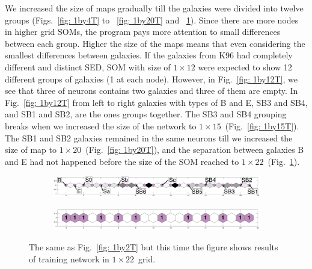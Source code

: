             We increased the size of maps gradually till the galaxies were divided into twelve groups (Figs.~\ref{fig: 1by4T} to ~\ref{fig: 1by20T} and ~\ref{fig: 1by22T}).
            Since there are more nodes in higher grid SOMs, the program pays more attention to small differences between each group.
            Higher the size of the maps means that even considering the smallest differences between galaxies.
            If the galaxies from K96 had completely different and distinct SED, SOM with size of $1\times12$ were expected to show 12 different groups of galaxies (1 at each node).
            However, in Fig.~\ref{fig: 1by12T}, we see that three of neurons contains two galaxies and  three of them are empty. 
            In Fig.~\ref{fig: 1by12T} from left to right galaxies with types of B and E, SB3 and SB4, and SB1 and SB2, are the ones groups together. 
            The SB3 and SB4 grouping breaks when we increased the size of the network to $1\times15$~(Fig.~\ref{fig: 1by15T}).
            The SB1 and SB2 galaxies remained in the same neurons till we increased the size of map to $1\times20$~(Fig.~\ref{fig: 1by20T}), and the separation between galaxies B and E had not happened before the size of the SOM reached to $1\times22$~(Fig.~\ref{fig: 1by22T}).
        \begin{figure}
            \begin{subfigure}[b]{\textwidth}
                \centering
                \includegraphics[width=\textwidth]{../images0.01/1d/dist_1_by_22.png}
            \end{subfigure}
            \hfill
            \begin{subfigure}[b]{\textwidth}
                \includegraphics[width=\textwidth]{../images0.01/1d/hit_t_1_by_22.png}
            \end{subfigure}
            \caption{The same as Fig.~\ref{fig: 1by2T} but this time the figure shows results of training network in $1\times22$~grid.}
            \label{fig: 1by22T}
        \end{figure} %
    
